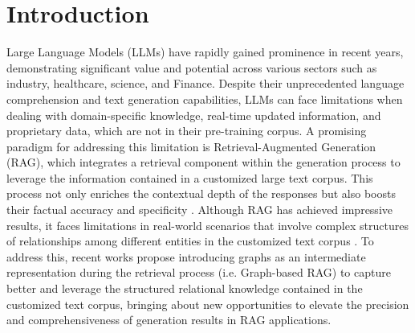 
\newcommand{\overviewBox}[1]{%
\tikz[baseline=-0.5ex]{\node[rounded corners=0.2em, 
fill=white, 
draw=bdcolor, 
minimum size=0.9em, 
text=bdcolor, 
text centered,
inner sep=0pt,
line width=0.9pt,
font=\fontsize{9pt}{0.9em}\fontseries{ul}\selectfont](TsNode){#1}}}

\section{Introduction}

Large Language Models (LLMs) have rapidly gained prominence in recent years, demonstrating significant value and potential across various sectors such as industry\cite{tiro2023possibility,wang2023chatgpt}, healthcare\cite{thirunavukarasu2023large,abd2023large,sallam2023chatgpt}, science\cite{wardat2023chatgpt,agler2011waste}, and Finance\cite{wu2023bloomberggpt,yang2023fingpt}. Despite their unprecedented language comprehension and text generation capabilities, LLMs can face limitations when dealing with domain-specific knowledge, real-time updated information, and proprietary data, which are not in their pre-training corpus\cite{gao2023retrieval}. A promising paradigm for addressing this limitation is Retrieval-Augmented Generation (RAG), which integrates a retrieval component within the generation process to leverage the information contained in a customized large text corpus. This process not only enriches the contextual depth of the responses but also boosts their factual accuracy and specificity \cite{peng2024graph, fan2024survey}. Although RAG has achieved impressive results, it faces limitations in real-world scenarios that involve complex structures of relationships among different entities in the customized text corpus \cite{peng2024graph, procko2024graph}. To address this, recent works \cite{edge2024local,wu2024medical,guo2024lightrag} propose introducing graphs as an intermediate representation during the retrieval process (i.e. Graph-based RAG) to capture better and leverage the structured relational knowledge contained in the customized text corpus, bringing about new opportunities to elevate the precision and comprehensiveness of generation results in RAG applications.

